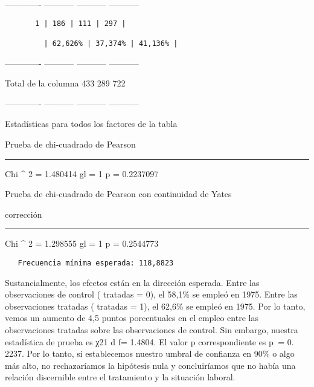 \documentclass[
]{book}
\begin{document}
------------- \textbar{} ----------- \textbar{} ----------- \textbar{} ----------- \textbar{}

\begin{verbatim}
       1 | 186 | 111 | 297 |

         | 62,626% | 37,374% | 41,136% |
\end{verbatim}

------------- \textbar{} ----------- \textbar{} ----------- \textbar{} ----------- \textbar{}

Total de la columna \textbar{} 433 \textbar{} 289 \textbar{} 722 \textbar{}

------------- \textbar{} ----------- \textbar{} ----------- \textbar{} ----------- \textbar{}

Estadísticas para todos los factores de la tabla

Prueba de chi-cuadrado de Pearson

\begin{center}\rule{0.5\linewidth}{0.5pt}\end{center}

Chi \^{} 2 = 1.480414 gl = 1 p = 0.2237097

Prueba de chi-cuadrado de Pearson con continuidad de Yates

corrección

\begin{center}\rule{0.5\linewidth}{0.5pt}\end{center}

Chi \^{} 2 = 1.298555 gl = 1 p = 0.2544773

\begin{verbatim}
   Frecuencia mínima esperada: 118,8823
\end{verbatim}

Sustancialmente, los efectos están en la dirección esperada. Entre las observaciones de control ( tratadas = 0), el 58,1\% se empleó en 1975. Entre las observaciones tratadas ( tratadas = 1), el 62,6\% se empleó en 1975. Por lo tanto, vemos un aumento de 4,5 puntos porcentuales en el empleo entre las observaciones tratadas sobre las observaciones de control. Sin embargo, nuestra estadística de prueba es χ21 d f= 1.4804. El valor p correspondiente es p  = 0. 2237. Por lo tanto, si establecemos nuestro umbral de confianza en 90\% o algo más alto, no rechazaríamos la hipótesis nula y concluiríamos que no había una relación discernible entre el tratamiento y la situación laboral.
\end{document}
